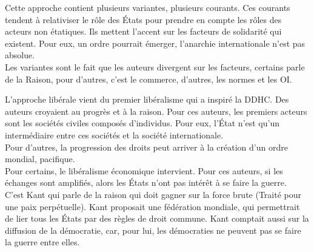 \documentclass[10pt, a4paper, openany]{book}
\begin{document}
Cette approche contient plusieurs variantes, plusieurs courants. Ces courants tendent à relativiser le rôle des États pour prendre en compte les rôles des acteurs non étatiques. Ils mettent l'accent sur les facteurs de solidarité qui existent. Pour eux, un ordre pourrait émerger, l'anarchie internationale n'est pas absolue. \\
Les variantes sont le fait que les auteurs divergent sur les facteurs, certains parle de la Raison, pour d'autres, c'est le commerce, d'autres, les normes et les OI. 


L'approche libérale vient du premier libéralisme qui a inspiré la DDHC. Des auteurs croyaient au progrès et à la raison. Pour ces auteurs, les premiers acteurs sont les sociétés civiles composés d'individus. Pour eux, l'État n'est qu'un intermédiaire entre ces sociétés et la société internationale. \\
Pour d'autres, la progression des droits peut arriver à la création d'un ordre mondial, pacifique. \\
Pour certains, le libéralisme économique intervient. Pour ces auteurs, si les échanges sont amplifiés, alors les États n'ont pas intérêt à se faire la guerre. \\
C'est Kant qui parle de la raison qui doit gagner sur la force brute (Traité pour une paix perpétuelle). Kant proposait une fédération mondiale, qui permettrait de lier tous les États par des règles de droit commune. Kant comptait aussi sur la diffusion de la démocratie, car, pour lui, les démocraties ne peuvent pas se faire la guerre entre elles. 
\end{document}
